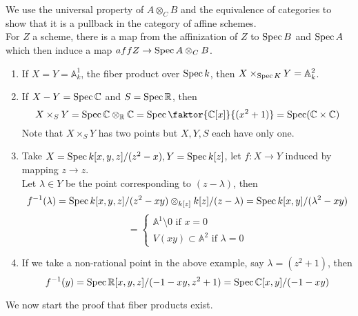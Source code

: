 \documentclass[../main.tex]{subfiles}
\begin{document}
\begin{propo}
We use the universal property of $A\otimes_C B$ and the equivalence of categories to show that it is a pullback in the category of affine schemes.\\
For $Z$ a scheme, there is a map from the affinization of $Z$ to $\operatorname{Spec} B$ and $\operatorname{Spec} A$ which then induce a map $aff Z\to \operatorname{Spec} A \otimes_C B$.
\end{propo}
\begin{exemple}
	\begin{enumerate}
	\item If $X= Y = \mathbb{A}^{1}_k$, the fiber product over $\operatorname{Spec} k$, then $X\times_{\operatorname{Spec} K} Y= \mathbb{A}^{2}_k$.
	\item If $X-Y = \operatorname{Spec} \mathbb{C}$ and $S= \operatorname{Spec} \mathbb{R}$, then
		\[ 
			X\times_S Y = \spec \mathbb{C}\otimes_{ \mathbb{R}} \mathbb{C}= \spec \faktor{ \mathbb{C}[x]}{( x^{2}+1) } = \spec ( \mathbb{C}\times \mathbb{C}) 
		\]
Note that $X\times_S Y$ has two points but $X,Y,S$ each have only one.
\item Take $X= \operatorname{Spec} k [ x,y,z] / ( z^{2}-x) , Y = \operatorname{Spec} k[z]$, let $f: X\to Y$ induced by mapping $z \to z$.\\
	Let $\lambda\in Y$ be the point corresponding to $( z-\lambda) $, then
	\[ 
		f^{-1}( \lambda) = \operatorname{Spec} k[x,y,z] /( z^{2}-xy) \otimes_{k[z]} k[z] / ( z-\lambda) = \operatorname{Spec} k[x,y] / ( \lambda^{2} -xy) 
	\]
	\[ 
= 
\begin{cases}
\mathbb{A}^{1}\setminus 0 \text{ if } x=0\\
V( xy) \subset \mathbb{A}^{2} \text{ if } \lambda=0
\end{cases}
	\]

\item If we take a non-rational point in the above example, say $\lambda= ( z^{2}+1) $, then 
	\[ 
		f^{-1}( y) = \operatorname{Spec} \mathbb{R}[x,y,z] / ( -1-xy, z^{2}+1) = \operatorname{Spec} \mathbb{C}[x,y] / ( -1-xy) 
	\]
	
	\end{enumerate}
\end{exemple}
We now start the proof that fiber products exist.
\end{document}

